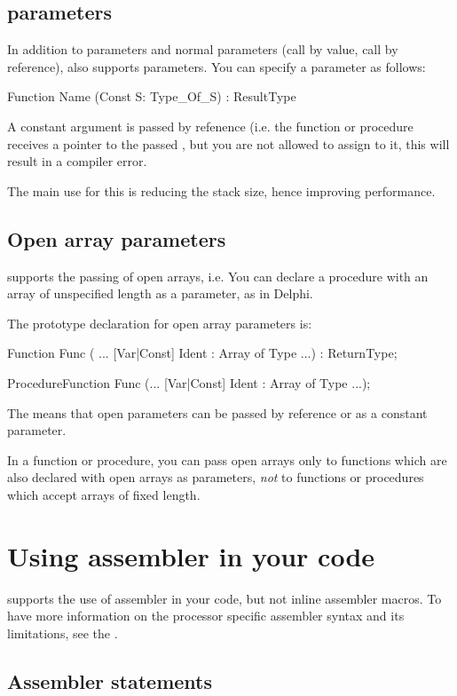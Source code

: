\documentclass{report}
\begin{document}
\subsection{ parameters}
In addition to  parameters and normal parameters (call by value,
call by reference), \fpc also supports  parameters. You can
specify a  parameter as follows:
\begin{listing}
Function Name (Const S: Type_Of_S) : ResultType
\end{listing}
A constant argument is passed by refenence 
(i.e. the function or procedure receives a pointer to the passed , 
but you are not allowed to assign to it, this will result in a compiler error.

The main use for this is reducing the stack size, hence improving
performance.

\subsection{Open array parameters}
\fpc supports the passing of open arrays, i.e. You can declare a procedure
with an array of unspecified length as a parameter, as in Delphi.

The prototype declaration for open array parameters is:
\begin{listing}
Function Func ( ... [Var|Const] Ident : Array of Type ...) : ReturnType;

ProcedureFunction Func (... [Var|Const] Ident : Array of Type ...);
\end{listing}
The  means that open parameters can be passed by reference
or as a constant parameter.

In a function or procedure, you can pass open arrays only to functions which
are also declared with open arrays as parameters, {\em not} to functions or
procedures which accept arrays of fixed length.

\section{Using assembler in your code}

\fpc supports the use of assembler in your code, but not inline
assembler macros.  To have more information on the processor
specific assembler syntax and its limitations, see the \progref.

\subsection{ Assembler statements }
\end{document}
